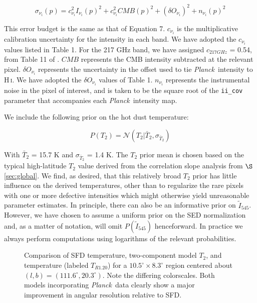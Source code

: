 \documentclass{emulateapj}
\newcommand{\PLANCK}{{\it Planck}}
\begin{document}
\begin{equation}
\sigma_{\nu_i}(p) = c^2_{\nu_i}I_{\nu_i}(p)^2 + c^2_{\nu_i}CMB(p)^2 + (\delta O_{\nu_i})^2 + n_{\nu_i}(p)^2
\end{equation}


This error budget is the same as that of \cite{planckdust} Equation 7. 
$c_{\nu_i}$ is the multiplicative calibration uncertainty for the intensity in 
each band. We have adopted the $c_{\nu_i}$ values listed in \cite{planckdust} 
Table 1. For the 217 GHz band, we have assigned $c_{217 GHz}$ = 0.54, from 
Table 11 of \cite{planckcalib}. $CMB$ represents the CMB intensity 
subtracted at the relevant pixel. $\delta O_{\nu_i}$ represents the uncertainty
in the offset used to tie \PLANCK~intensity to H\,\textsc{i}. We have adopted 
the  $\delta O_{\nu_i}$ values of \cite{planckdust} Table 1. $n_{\nu_i}$ 
represents the instrumental noise in the pixel of interest, and is taken to be 
the square root of the \verb|ii_cov| parameter that accompanies each 
\PLANCK~intensity map.

We include the following prior on the hot dust temperature:

\begin{equation} \label{equ:t2prior}
P(T_2) = \mathcal{N}(T_2|\bar{T}_2, \sigma_{\bar{T}_2})
\end{equation}

With $\bar{T}_2$ = 15.7 K and $\sigma_{\bar{T}_2}$ = 1.4 K. The $T_2$ prior 
mean is chosen based on the typical high-latitude $T_2$ value derived from
the correlation slope analysis from $\S$\ref{sec:global}. We find, as 
desired, that this relatively broad $T_2$ prior has little influence on the 
derived temperatures, other than to regularize the rare pixels with one or more
defective intensities which might otherwise yield unreasonable parameter
estimates. In principle, there can also be an informative prior on 
$\tilde{I}_{545}$. However, we have chosen to assume a uniform prior on the SED
normalization and, as a matter of notation, will omit $P(\tilde{I}_{545})$ 
henceforward. In practice we always perform computations using logarithms of 
the relevant probabilities.

\begin{figure}
\begin{center}
\caption{\label{fig:comparison} Comparison of SFD temperature, two-component 
model $T_2$, and \cite{planckdust} temperature (labeled $T_{R1.20}$) for a
 $10.5^{\circ}\times8.3^{\circ}$  region centered about 
$(l,b) = (111.6^{\circ}, 20.3^{\circ})$. Note the differing colorscales. Both 
models incorporating \PLANCK~data clearly show a major improvement in angular 
resolution relative to SFD.}
\end{center}
\end{figure}
\end{document}
